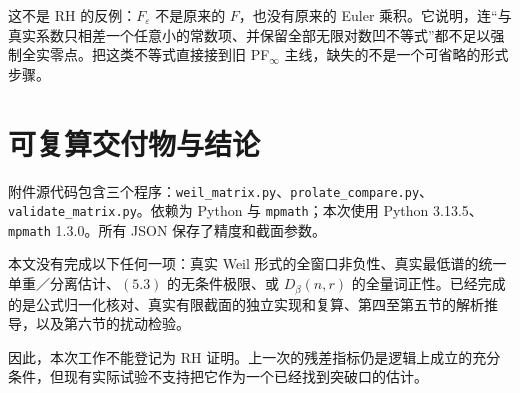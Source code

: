 \documentclass[UTF8,fontset=none,11pt,a4paper]{ctexart}
\begin{document}
这不是 RH 的反例：$F_\varepsilon$ 不是原来的 $F$，也没有原来的 Euler 乘积。它说明，连“与真实系数只相差一个任意小的常数项、并保留全部无限对数凹不等式”都不足以强制全实零点。把这类不等式直接接到旧 PF$_\infty$ 主线，缺失的不是一个可省略的形式步骤。

\section{可复算交付物与结论}
附件源代码包含三个程序：\texttt{weil\_matrix.py}、\texttt{prolate\_compare.py}、\texttt{validate\_matrix.py}。依赖为 Python 与 \texttt{mpmath}；本次使用 Python 3.13.5、\texttt{mpmath} 1.3.0。所有 JSON 保存了精度和截面参数。

本文没有完成以下任何一项：真实 Weil 形式的全窗口非负性、真实最低谱的统一单重／分离估计、$(5.3)$ 的无条件极限、或 $D_\beta(n,r)$ 的全量词正性。已经完成的是公式归一化核对、真实有限截面的独立实现和复算、第四至第五节的解析推导，以及第六节的扰动检验。

因此，本次工作不能登记为 RH 证明。上一次的残差指标仍是逻辑上成立的充分条件，但现有实际试验不支持把它作为一个已经找到突破口的估计。
\end{document}
